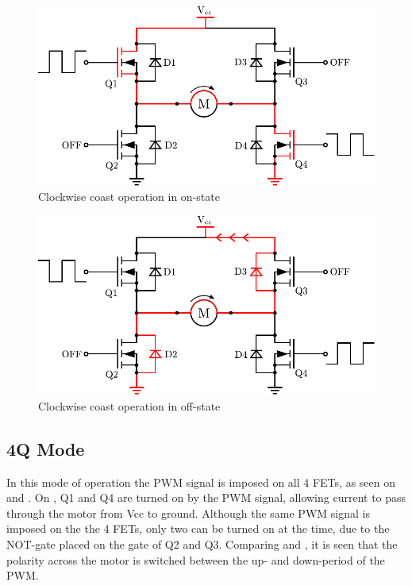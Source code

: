   \begin{minipage}{\linewidth}
  	\centering
  	\begin{minipage}{0.45\linewidth}
  		\begin{figure}[H]
  			\centering
  			\includegraphics[scale=.6]{figures/HbridgeClockwiseCoastON.pdf}
  			\caption{Clockwise coast operation in on-state}
  			\label{figures/HbridgeClokwiseCoastON}
  		\end{figure}
  	\end{minipage}
  	\hspace{0.03\linewidth}
  	\begin{minipage}{0.45\linewidth}
  		\begin{figure}[H]
  			\centering
  			\includegraphics[scale=.6]{figures/HbridgeClockwiseCoastRegen.pdf}
  			\caption{Clockwise coast operation in off-state}
  			\label{HbridgeClokwiseCoastRegen}
  		\end{figure}
  	\end{minipage}
  \end{minipage}

\subsection{4Q Mode}
In this mode of operation the PWM signal is imposed on all 4 FETs, as seen on  and . On , Q1 and Q4 are turned on by the PWM signal, allowing current to pass through the motor from Vcc to ground. Although the same PWM signal is imposed on the the 4 FETs, only two can be turned on at the time, due to the NOT-gate placed on the gate of Q2 and Q3. Comparing  and , it is seen that the polarity across the motor is switched between the up- and down-period of the PWM.

